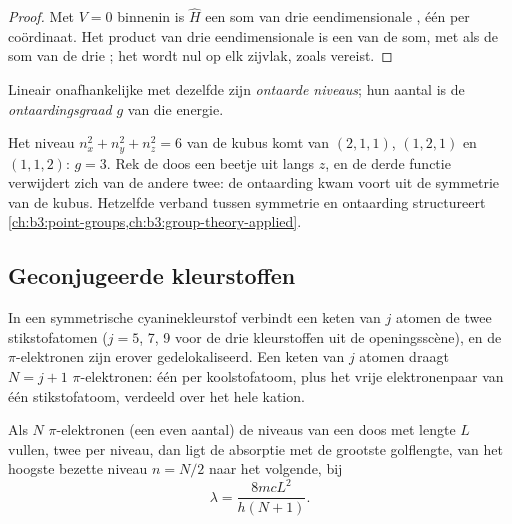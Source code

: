 \begin{proof}
Met $V = 0$ binnenin is $\hat H$ een som van drie eendimensionale
, één per coördinaat. Het product van drie eendimensionale
 is een  van de som, met als  de som
van de drie ; het wordt nul op elk zijvlak, zoals vereist.
\end{proof}

\begin{definition}\label{def:b3:quantum-model-systems:degenerate}
Lineair onafhankelijke  met dezelfde  zijn
\emph{ontaarde niveaus}; hun aantal is de
\emph{ontaardingsgraad} $g$ van die energie.
\end{definition}

\begin{example}\label{ex:b3:quantum-model-systems:cube}
Het niveau $n_x^2 + n_y^2 + n_z^2 = 6$ van de kubus komt van $(2,1,1)$,
$(1,2,1)$ en $(1,1,2)$: $g = 3$. Rek de doos een beetje uit langs $z$, en de
derde functie verwijdert zich van de andere twee: de ontaarding kwam voort
uit de symmetrie van de kubus. Hetzelfde verband tussen symmetrie en
ontaarding structureert \cref{ch:b3:point-groups,ch:b3:group-theory-applied}.
\end{example}

\subsection*{Geconjugeerde kleurstoffen}

In een symmetrische cyaninekleurstof verbindt een keten van $j$ atomen de
twee stikstofatomen
(\(j = 5\), 7, 9 voor de drie kleurstoffen uit de openingsscène), en de
$\pi$-elektronen zijn erover gedelokaliseerd. Een keten van $j$ atomen
draagt $N = j + 1$ $\pi$-elektronen: één per koolstofatoom, plus het vrije
elektronenpaar van één stikstofatoom, verdeeld over het hele kation.

\begin{proposition}\label{prop:b3:quantum-model-systems:free-electron}
Als $N$ $\pi$-elektronen (een even aantal) de niveaus van een doos met
lengte $L$ vullen, twee per niveau, dan ligt de absorptie met de grootste
golflengte, van het hoogste bezette niveau $n = N/2$ naar het volgende, bij
\[
\lambda = \frac{8mcL^2}{h(N+1)}.
\]
\end{proposition}

